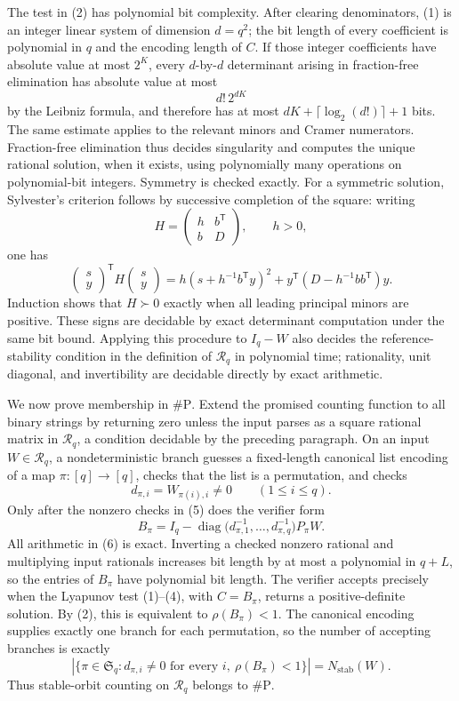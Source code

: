 The test in (2) has polynomial bit complexity. After clearing denominators, (1) is an integer linear system of dimension \(d=q^2\); the bit length of every coefficient is polynomial in \(q\) and the encoding length of \(C\). If those integer coefficients have absolute value at most \(2^K\), every \(d\)-by-\(d\) determinant arising in fraction-free elimination has absolute value at most
\[
 d!\,2^{dK}
\]
by the Leibniz formula, and therefore has at most \(dK+\lceil\log_2(d!)\rceil+1\) bits. The same estimate applies to the relevant minors and Cramer numerators. Fraction-free elimination thus decides singularity and computes the unique rational solution, when it exists, using polynomially many operations on polynomial-bit integers. Symmetry is checked exactly. For a symmetric solution, Sylvester's criterion follows by successive completion of the square: writing
\[
 H=\begin{pmatrix}h&b^{\mathsf T}\\ b&D\end{pmatrix},
 \qquad h>0,
\]
one has
\[
 \begin{pmatrix}s\\y\end{pmatrix}^{\!\mathsf T}
 H
 \begin{pmatrix}s\\y\end{pmatrix}
 =h\left(s+h^{-1}b^{\mathsf T}y\right)^2
  +y^{\mathsf T}\left(D-h^{-1}bb^{\mathsf T}\right)y.
\]
Induction shows that \(H\succ0\) exactly when all leading principal minors are positive. These signs are decidable by exact determinant computation under the same bit bound. Applying this procedure to \(I_q-W\) also decides the reference-stability condition in the definition of \(\mathcal R_q\) in polynomial time; rationality, unit diagonal, and invertibility are decidable directly by exact arithmetic.

We now prove membership in \(\#\mathrm P\). Extend the promised counting function to all binary strings by returning zero unless the input parses as a square rational matrix in \(\mathcal R_q\), a condition decidable by the preceding paragraph. On an input \(W\in\mathcal R_q\), a nondeterministic branch guesses a fixed-length canonical list encoding of a map \(\pi:[q]\to[q]\), checks that the list is a permutation, and checks
\[
 d_{\pi,i}=W_{\pi(i),i}\neq0
 \qquad(1\leq i\leq q). \tag{5}
\]
Only after the nonzero checks in (5) does the verifier form
\[
 B_\pi
 =I_q-
 \operatorname{diag}\bigl(d_{\pi,1}^{-1},\ldots,d_{\pi,q}^{-1}\bigr)
 P_\pi W. \tag{6}
\]
All arithmetic in (6) is exact. Inverting a checked nonzero rational and multiplying input rationals increases bit length by at most a polynomial in \(q+L\), so the entries of \(B_\pi\) have polynomial bit length. The verifier accepts precisely when the Lyapunov test (1)--(4), with \(C=B_\pi\), returns a positive-definite solution. By (2), this is equivalent to \(\rho(B_\pi)<1\). The canonical encoding supplies exactly one branch for each permutation, so the number of accepting branches is exactly
\[
 |\{\pi\in\mathfrak S_q:d_{\pi,i}\neq0\text{ for every }i,\ 
 \rho(B_\pi)<1\}|
 =N_{\mathrm{stab}}(W).
\]
Thus stable-orbit counting on \(\mathcal R_q\) belongs to \(\#\mathrm P\).

